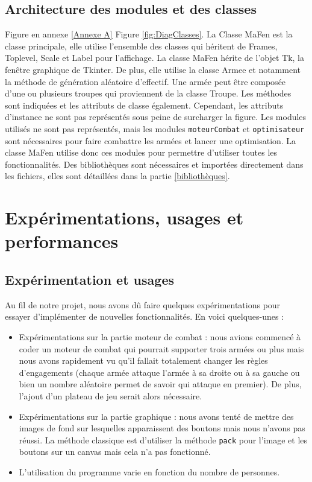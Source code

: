 \documentclass[a4paper]{article} %
\begin{document}
	\subsection{Architecture des modules et des classes}
Figure en annexe \ref{Annexe A} Figure \ref{fig:DiagClasses}.
La Classe MaFen est la classe principale, elle utilise l'ensemble des classes qui héritent de Frames, Toplevel, Scale et Label pour l'affichage. La classe MaFen hérite de l'objet Tk, la fenêtre graphique de Tkinter. 
De plus, elle utilise la classe Armee et notamment la méthode de génération aléatoire d'effectif. Une armée peut être composée d'une ou plusieurs troupes qui proviennent de la classe Troupe. Les méthodes sont indiquées et les attributs de classe également. Cependant, les attributs d'instance ne sont pas représentés sous peine de surcharger la figure.
Les modules utilisés ne sont pas représentés, mais les modules \texttt{moteurCombat} et \texttt{optimisateur} sont nécessaires pour faire combattre les armées et lancer une optimisation. La classe MaFen utilise donc ces modules pour permettre d'utiliser toutes les fonctionnalités. Des bibliothèques sont nécessaires et importées directement dans les fichiers, elles sont détaillées dans la partie \ref{bibliothèques}.

\section{Expérimentations, usages et performances}
	\subsection{Expérimentation et usages}
Au fil de notre projet, nous avons dû faire quelques expérimentations pour essayer d'implémenter de nouvelles fonctionnalités. En voici quelques-unes : 
\begin{itemize}
\item Expérimentations sur la partie moteur de combat : nous avions commencé à coder un moteur de combat qui pourrait supporter trois armées ou plus mais nous avons rapidement vu qu'il fallait totalement changer les règles d'engagements (chaque armée attaque l'armée à sa droite ou à sa gauche ou bien un nombre aléatoire permet de savoir qui attaque en premier). De plus, l'ajout d'un plateau de jeu serait alors nécessaire.
\item Expérimentations sur la partie graphique : nous avons tenté de mettre des images de fond sur lesquelles apparaissent des boutons mais nous n'avons pas réussi. La méthode classique est d'utiliser la méthode \texttt{pack} pour l'image et les boutons sur un canvas mais cela n'a pas fonctionné.
\item L'utilisation du programme varie en fonction du nombre de personnes.
\end{itemize}
\end{document}
